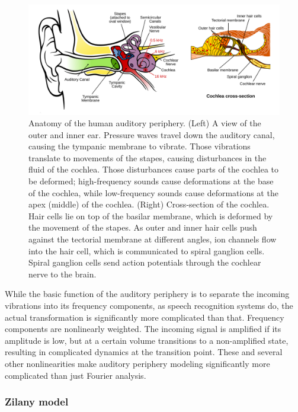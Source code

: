 \documentclass{article}
\begin{document}
\begin{figure}
  \begin{center}
    \includegraphics[width=1\linewidth]{periphery-anatomy}
  \end{center}
  \caption{Anatomy of the human auditory periphery.
    (Left) A view of the outer and inner ear.
    Pressure waves travel down the auditory canal,
    causing the tympanic membrane to vibrate.
    Those vibrations translate to movements of the stapes,
    causing disturbances in the fluid of the cochlea.
    Those disturbances cause parts of the cochlea
    to be deformed; high-frequency sounds cause
    deformations at the base of the cochlea,
    while low-frequency sounds cause deformations
    at the apex (middle) of the cochlea.
    (Right) Cross-section of the cochlea.
    Hair cells lie on top of the basilar membrane,
    which is deformed by the movement of the stapes.
    As outer and inner hair cells push against the
    tectorial membrane at different angles,
    ion channels flow into the hair cell,
    which is communicated to spiral ganglion cells.
    Spiral ganglion cells send action potentials
    through the cochlear nerve to the brain.}
  \label{fig:anatomy}
\end{figure}

While the basic function of the auditory periphery
is to separate the incoming vibrations
into its frequency components,
as speech recognition systems do,
the actual transformation is significantly
more complicated than that.
Frequency components are nonlinearly weighted.
The incoming signal is amplified
if its amplitude is low,
but at a certain volume transitions
to a non-amplified state,
resulting in complicated dynamics
at the transition point.
These and several other nonlinearities
make auditory periphery modeling
significantly more complicated
than just Fourier analysis.

\subsubsection{Zilany model}
\label{subsec:zilany}
\end{document}
